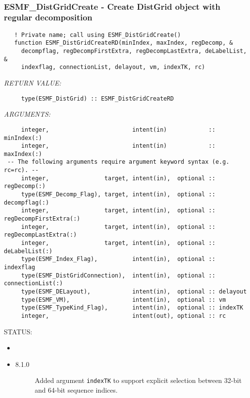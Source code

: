  
\mbox{}\hrulefill\ 
 
\subsubsection [ESMF\_DistGridCreate] {ESMF\_DistGridCreate - Create DistGrid object with regular decomposition}


 
\begin{verbatim}   ! Private name; call using ESMF_DistGridCreate()
   function ESMF_DistGridCreateRD(minIndex, maxIndex, regDecomp, &
     decompflag, regDecompFirstExtra, regDecompLastExtra, deLabelList, &
     indexflag, connectionList, delayout, vm, indexTK, rc)
           \end{verbatim}{\em RETURN VALUE:}
\begin{verbatim}     type(ESMF_DistGrid) :: ESMF_DistGridCreateRD\end{verbatim}{\em ARGUMENTS:}
\begin{verbatim}     integer,                        intent(in)            :: minIndex(:)
     integer,                        intent(in)            :: maxIndex(:)
 -- The following arguments require argument keyword syntax (e.g. rc=rc). --
     integer,                target, intent(in),  optional :: regDecomp(:)
     type(ESMF_Decomp_Flag), target, intent(in),  optional :: decompflag(:)
     integer,                target, intent(in),  optional :: regDecompFirstExtra(:)
     integer,                target, intent(in),  optional :: regDecompLastExtra(:)
     integer,                target, intent(in),  optional :: deLabelList(:)
     type(ESMF_Index_Flag),          intent(in),  optional :: indexflag
     type(ESMF_DistGridConnection),  intent(in),  optional :: connectionList(:)
     type(ESMF_DELayout),            intent(in),  optional :: delayout
     type(ESMF_VM),                  intent(in),  optional :: vm
     type(ESMF_TypeKind_Flag),       intent(in),  optional :: indexTK
     integer,                        intent(out), optional :: rc\end{verbatim}
{\sf STATUS:}
   \begin{itemize}
   \item{}
   \item{}
   \begin{description}
   \item[8.1.0] Added argument {\tt indexTK} to support explicit selection
                between 32-bit and 64-bit sequence indices.
   \end{description}
   \end{itemize}
  
